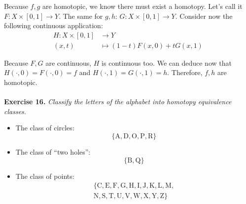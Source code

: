 \documentclass{article}
\begin{document}
    Because $f, g$ are homotopic, we know there must exist a homotopy.
    Let's call it $F \colon X \times [0, 1] \to Y$.
    The same for $g, h$:
    $G \colon X \times [0, 1] \to Y$.
    Consider now the following continuous application:
    \begin{align*}
        H \colon X \times [0, 1] &\longrightarrow Y \\
        (x, t) &\mapsto (1 - t) F(x, 0) + t G(x, 1)
    \end{align*}

    Because $F, G$ are continuous, $H$ is continuous too.
    We can deduce now that $H(\cdot, 0) = F(\cdot, 0) = f$ and $H(\cdot, 1) = G(\cdot, 1) = h$.
    Therefore, $f, h$ are homotopic. \\\\

    \noindent\textbf{Exercise 16.} \textit{Classify the letters of the alphabet into homotopy equivalence classes.} \\  

    \begin{itemize}
        \item The class of circles:
            \Huge
            $$\{\textrm{A}, \textrm{D}, \textrm{O}, \textrm{P}, \textrm{R}\}$$
            \normalsize

        \item The class of ``two holes'':
            \Huge
            $$\{\textrm{B}, \textrm{Q}\}$$
            \normalsize
        
        \item The class of points:
            \Huge
            \begin{gather*}
                \{\textrm{C}, \textrm{E}, \textrm{F}, \textrm{G}, \textrm{H}, \textrm{I}, \textrm{J}, \textrm{K}, \textrm{L}, \textrm{M},\\ \textrm{N}, \textrm{S}, \textrm{T}, \textrm{U}, \textrm{V}, \textrm{W}, \textrm{X}, \textrm{Y}, \textrm{Z}\}
            \end{gather*}
            \normalsize
    \end{itemize}
\end{document}
